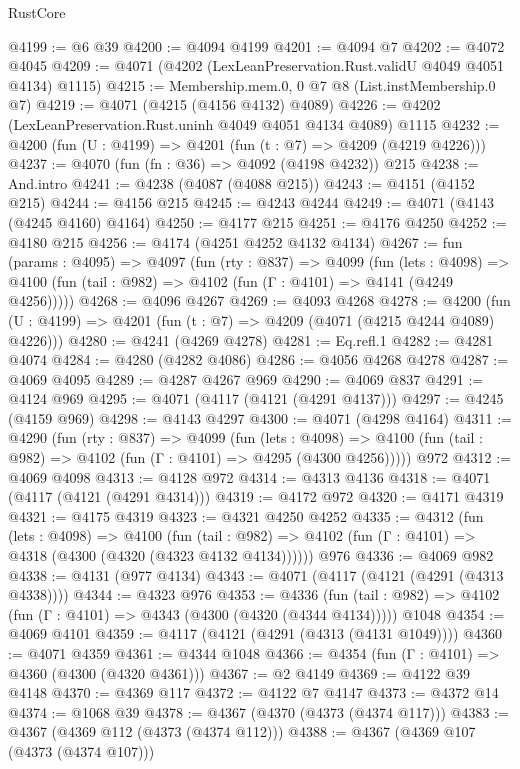 \begin{lexlean}{RustCore}
\begin{coremodule}
@4199 := @6 @39
@4200 := @4094 @4199
@4201 := @4094 @7
@4202 := @4072 @4045
@4209 := @4071 (@4202 (LexLeanPreservation.Rust.validU @4049 @4051 @4134) @1115)
@4215 := Membership.mem.{0, 0} @7 @8 (List.instMembership.{0} @7)
@4219 := @4071 (@4215 (@4156 @4132) @4089)
@4226 := @4202 (LexLeanPreservation.Rust.uninh @4049 @4051 @4134 @4089) @1115
@4232 := @4200 (fun (U : @4199) => @4201 (fun (t : @7) => @4209 (@4219 @4226)))
@4237 := @4070 (fun (fn : @36) => @4092 (@4198 @4232)) @215
@4238 := And.intro
@4241 := @4238 (@4087 (@4088 @215))
@4243 := @4151 (@4152 @215)
@4244 := @4156 @215
@4245 := @4243 @4244
@4249 := @4071 (@4143 (@4245 @4160) @4164)
@4250 := @4177 @215
@4251 := @4176 @4250
@4252 := @4180 @215
@4256 := @4174 (@4251 @4252 @4132 @4134)
@4267 := fun (params : @4095) =>
  @4097
    (fun (rty : @837) =>
    @4099
      (fun (lets : @4098) =>
      @4100 (fun (tail : @982) => @4102 (fun (Γ : @4101) => @4141 (@4249 @4256)))))
@4268 := @4096 @4267
@4269 := @4093 @4268
@4278 := @4200 (fun (U : @4199) => @4201 (fun (t : @7) => @4209 (@4071 (@4215 @4244 @4089) @4226)))
@4280 := @4241 (@4269 @4278)
@4281 := Eq.refl.{1}
@4282 := @4281 @4074
@4284 := @4280 (@4282 @4086)
@4286 := @4056 @4268 @4278
@4287 := @4069 @4095
@4289 := @4287 @4267 @969
@4290 := @4069 @837
@4291 := @4124 @969
@4295 := @4071 (@4117 (@4121 (@4291 @4137)))
@4297 := @4245 (@4159 @969)
@4298 := @4143 @4297
@4300 := @4071 (@4298 @4164)
@4311 := @4290
    (fun (rty : @837) =>
    @4099
      (fun (lets : @4098) =>
      @4100 (fun (tail : @982) => @4102 (fun (Γ : @4101) => @4295 (@4300 @4256)))))
    @972
@4312 := @4069 @4098
@4313 := @4128 @972
@4314 := @4313 @4136
@4318 := @4071 (@4117 (@4121 (@4291 @4314)))
@4319 := @4172 @972
@4320 := @4171 @4319
@4321 := @4175 @4319
@4323 := @4321 @4250 @4252
@4335 := @4312
    (fun (lets : @4098) =>
    @4100
      (fun (tail : @982) => @4102 (fun (Γ : @4101) => @4318 (@4300 (@4320 (@4323 @4132 @4134))))))
    @976
@4336 := @4069 @982
@4338 := @4131 (@977 @4134)
@4343 := @4071 (@4117 (@4121 (@4291 (@4313 @4338))))
@4344 := @4323 @976
@4353 := @4336
    (fun (tail : @982) => @4102 (fun (Γ : @4101) => @4343 (@4300 (@4320 (@4344 @4134)))))
    @1048
@4354 := @4069 @4101
@4359 := @4117 (@4121 (@4291 (@4313 (@4131 @1049))))
@4360 := @4071 @4359
@4361 := @4344 @1048
@4366 := @4354 (fun (Γ : @4101) => @4360 (@4300 (@4320 @4361)))
@4367 := @2 @4149
@4369 := @4122 @39 @4148
@4370 := @4369 @117
@4372 := @4122 @7 @4147
@4373 := @4372 @14
@4374 := @1068 @39
@4378 := @4367 (@4370 (@4373 (@4374 @117)))
@4383 := @4367 (@4369 @112 (@4373 (@4374 @112)))
@4388 := @4367 (@4369 @107 (@4373 (@4374 @107)))

\end{coremodule}
\end{lexlean}

